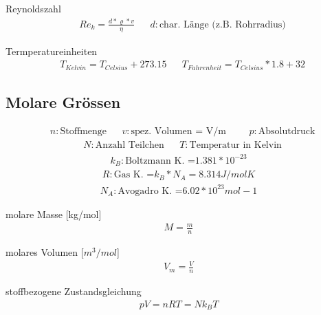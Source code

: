 \documentclass[17pt]{extarticle}
\begin{document}
	Reynoldszahl
	\begin{align}
		&Re_k = \frac{d* \varrho * v}{\eta}
		&&d: \text{char. Länge (z.B. Rohrradius)}
	\end{align}

	Termperatureinheiten
	\begin{align}
		&T_{Kelvin} = T_{Celsius} + 273.15
		&&T_{Fahrenheit} = T_{Celsius} * 1.8 + 32
	\end{align}


\subsection{Molare Grössen}
	\begin{align}
		&n: \text{Stoffmenge}
		&&v: \text{spez. Volumen = V/m}
		&&&p: \text{Absolutdruck}
	\end{align}
	\begin{align}
		&N: \text{Anzahl Teilchen}
		&&T: \text{Temperatur in Kelvin}
	\end{align}
	\begin{align}
		k_B: \text{Boltzmann K. =} 1.381 * 10^{-23}
	\end{align}
	\begin{align}		
		R: \text{Gas K. =} k_B * N_A = 8.314 J/mol K
	\end{align}
	\begin{align}
		N_A: \text{Avogadro K. =} 6.02 * 10^{23} mol-1
	\end{align}

	molare Masse [kg/mol]
	\begin{align}
		M = \frac{m}{n}
	\end{align}

	molares Volumen [$m^3/mol$]
	\begin{align}
		V_m = \frac{V}{n}
	\end{align}
	
	stoffbezogene Zustandsgleichung
	\begin{align}
		pV = n R T = N k_B T
	\end{align}
	
\end{document}
